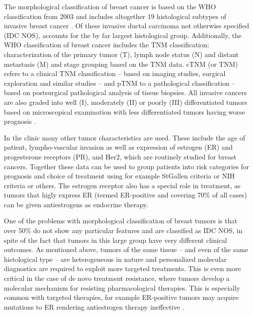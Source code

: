 The morphological classification of breast cancer is based on the WHO
classification from 2003 and includes altogether 19 histological subtypes of
invasive breast cancer \citep{Tavassoli2003,Weigelt2009}. Of these invasive
ductal carcinoma not otherwise specified (IDC NOS), accounts for the by far
largest histological group. Additionally, the WHO classification of
breast cancer includes the
TNM classification; characterization of the primary tumor (T), lymph node
status (N) and distant metastasis (M) and stage grouping based on the TNM
data. cTNM (or TNM) refers to a clinical TNM classification -- based on imaging studies,
surgical exploration and similar studies -- and pTNM to a pathological
classification -- based on postsurgical pathological analysis of tissue
biopsies. All invasive cancers are also graded into well (I), moderately (II)
or poorly (III) differentiated tumors based on microscopical examination
with less differentiated tumors having worse prognosis \citep{Tavassoli2003}.

In the clinic many other tumor characteristics are used. These
include the age of patient, lympho-vascular invasion as well as expression of
estrogen (ER) and progesterone receptors (PR), and Her2, which are routinely
studied for breast cancers. Together these data can be used to group patients
into risk categories for prognosis and choice of treatment using for example
StGallen criteria \citep{Goldhirsch2007} or NIH criteria \citep{Eifel2001} or others.
The estrogen receptor also has a special role in treatment, as tumors that higly express ER
(termed ER-positive and covering 70\% of all cases) can be given antiestrogens
as endocrine therapy.

One of the problems with morphological classification of breast tumors is that
over 50\% do not show any particular features and are classified as IDC NOS,
in spite of the fact that tumors in this large group have very different
clinical outcomes. As mentioned above, tumors of the same tissue -- and even
of the same histological type -- are heterogeneous in nature and personalized
molecular diagnostics are required to exploit more targeted treatments. This
is even more critical in the case of de novo treatment resistance, where
tumors develop a molecular mechanism for resisting pharmacological therapies.
This is especially common with targeted therapies, for example ER-positive
tumors may acquire mutations to ER rendering antiestrogen therapy ineffective
\citep{Oesterreich2013}.

